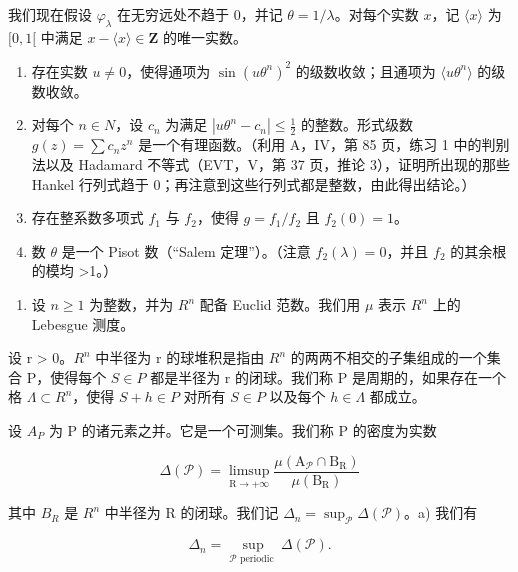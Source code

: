 我们现在假设 \(\varphi_{\lambda}\) 在无穷远处不趋于 0，并记 \(\theta = 1 / \lambda\)。对每个实数 \(x\)，记 \(\langle x\rangle\) 为 \([0,1[\) 中满足 \(x - \langle x\rangle \in \mathbf{Z}\) 的唯一实数。

\begin{enumerate}
\def\labelenumi{\alph{enumi})}
\setcounter{enumi}{7}
\item
  存在实数 \(u \neq 0\)，使得通项为 \(\sin(u\theta^{n})^{2}\) 的级数收敛；且通项为 \(\langle u\theta^{n}\rangle\) 的级数收敛。
\item
  对每个 \(n \in N\)，设 \(c_{n}\) 为满足 \(|u\theta^{n} - c_{n}| \leqslant \frac{1}{2}\) 的整数。形式级数 \(g(z) = \sum c_{n}z^{n}\) 是一个有理函数。（利用 A，IV，第 85 页，练习 1 中的判别法以及 Hadamard 不等式（EVT，V，第 37 页，推论 3），证明所出现的那些 Hankel 行列式趋于 0；再注意到这些行列式都是整数，由此得出结论。）
\item
  存在整系数多项式 \(f_1\) 与 \(f_2\)，使得 \(g = f_1 / f_2\) 且 \(f_2(0) = 1\)。
\item
  数 \(\theta\) 是一个 Pisot 数（“Salem 定理”）。（注意 \(f_{2}(\lambda)=0\)，并且 \(f_{2}\) 的其余根的模均 \textgreater1。）
\end{enumerate}

\begin{enumerate}
\def\labelenumi{\arabic{enumi})}
\setcounter{enumi}{58}
\tightlist
\item
  设 \(n \geqslant 1\) 为整数，并为 \(R^{n}\) 配备 Euclid 范数。我们用 \(\mu\) 表示 \(R^{n}\) 上的 Lebesgue 测度。
\end{enumerate}

设 r \textgreater{} 0。\(R^{n}\) 中半径为 r 的球堆积是指由 \(R^{n}\) 的两两不相交的子集组成的一个集合 P，使得每个 \(S \in P\) 都是半径为 r 的闭球。我们称 P 是周期的，如果存在一个格 \(\Lambda \subset R^{n}\)，使得 \(S + h \in P\) 对所有 \(S \in P\) 以及每个 \(h \in \Lambda\) 都成立。

设 \(A _{P}\) 为 P 的诸元素之并。它是一个可测集。我们称 P 的密度为实数

\[
\Delta (\mathcal {P}) = \limsup _ {\mathrm{R} \to + \infty} \frac {\mu (\mathrm{A} _ {\mathcal {P}} \cap \mathrm{B} _ {\mathrm{R}})}{\mu (\mathrm{B} _ {\mathrm{R}})}
\]

其中 \(B_{R}\) 是 \(R^{n}\) 中半径为 R 的闭球。我们记 \(\Delta_{n} = \sup_{\mathcal{P}} \Delta(\mathcal{P})\)。a) 我们有

\[
\Delta_ {n} = \sup _ {\mathcal {P} \text {   periodic }} \Delta (\mathcal {P}).
\]

